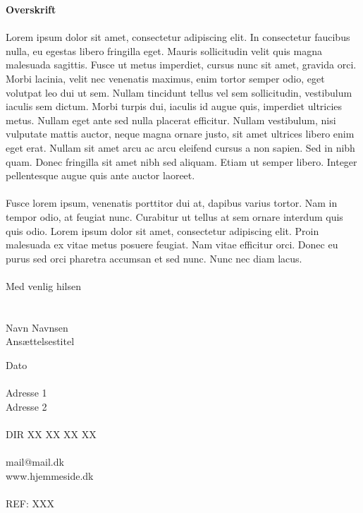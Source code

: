 \documentclass[12pt]{article}
\begin{document}
\begin{paracol}{2}
    \begin{tcolorbox}[blanker, breakable, width=\linewidth]

    \textbf{Overskrift}
    \\
    \\
    Lorem ipsum dolor sit amet, consectetur adipiscing elit. In consectetur faucibus nulla, eu egestas libero fringilla eget. Mauris sollicitudin velit quis magna malesuada sagittis. Fusce ut metus imperdiet, cursus nunc sit amet, gravida orci. Morbi lacinia, velit nec venenatis maximus, enim tortor semper odio, eget volutpat leo dui ut sem. Nullam tincidunt tellus vel sem sollicitudin, vestibulum iaculis sem dictum. Morbi turpis dui, iaculis id augue quis, imperdiet ultricies metus. Nullam eget ante sed nulla placerat efficitur. Nullam vestibulum, nisi vulputate mattis auctor, neque magna ornare justo, sit amet ultrices libero enim eget erat. Nullam sit amet arcu ac arcu eleifend cursus a non sapien. Sed in nibh quam. Donec fringilla sit amet nibh sed aliquam. Etiam ut semper libero. Integer pellentesque augue quis ante auctor laoreet.
    \\
    \\
    Fusce lorem ipsum, venenatis porttitor dui at, dapibus varius tortor. Nam in tempor odio, at feugiat nunc. Curabitur ut tellus at sem ornare interdum quis quis odio. Lorem ipsum dolor sit amet, consectetur adipiscing elit. Proin malesuada ex vitae metus posuere feugiat. Nam vitae efficitur orci. Donec eu purus sed orci pharetra accumsan et sed nunc. Nunc nec diam lacus.
    \\
    \\
    Med venlig hilsen
    \\
    \\
    \\
    Navn Navnsen\\
    Ansættelsestitel
        
    \end{tcolorbox}
    \switchcolumn
    \begin{tcolorbox}[blanker, breakable, width=\linewidth]
    {\fontsize{8}{14}\selectfont

    Dato
    \\ \\
    Adresse 1 \\
    Adresse 2
    \\ \\
    DIR XX XX XX XX
    \\ \\
    mail@mail.dk \\
    www.hjemmeside.dk
    \\ \\
    REF: XXX

    }
    \end{tcolorbox}
\end{paracol}
\end{document}

